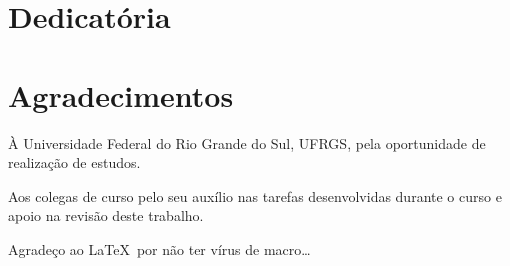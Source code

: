 \documentclass[main.tex]{subfiles}
\begin{document}
	\maketitle
	
	
	\notoc\chapter{Dedicatória} %
	
	
	
	\notoc\chapter{Agradecimentos}
	
	\`{A} Universidade Federal do Rio Grande do Sul, UFRGS, pela
	oportunidade de realização de estudos.
	
	Aos colegas de curso pelo seu auxílio nas tarefas desenvolvidas durante o
	curso e apoio na revisão deste trabalho.
	
	Agradeço ao \LaTeX\ por não ter vírus de macro\ldots
	
\end{document}
